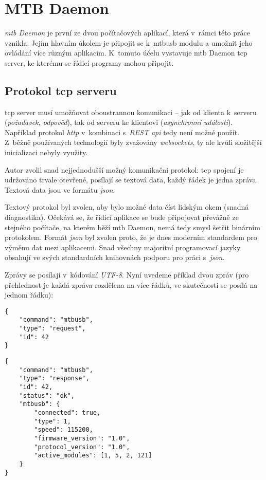 \newpage
\section{MTB Daemon}

\textit{\gls{mtb} Daemon} je první ze dvou počítačových aplikací, která v~rámci
této práce vznikla. Jejím hlavním úkolem je připojit se k~\gls{mtbusb} modulu a
umožnit jeho ovládání více různým aplikacím. K~tomuto účelu vystavuje \gls{mtb}
Daemon \gls{tcp} server, ke kterému se řídicí programy mohou připojit.

\subsection{Protokol \gls{tcp} serveru} \label{sec:daemon:proto}

\gls{tcp} server musí umožňovat oboustrannou komunikaci – jak od klienta k~serveru
(\textit{požadavek, odpověď}), tak od serveru ke klientovi (\textit{asynchronní
události}). Například protokol \textit{http} v~kombinaci s~\textit{REST \gls{api}}
tedy není možné použít. Z~běžně používaných technologií byly zvažovány
\textit{websockets}, ty ale kvůli složitější inicializaci nebyly využity.

Autor zvolil snad nejjednodušší možný komunikační protokol: \gls{tcp} spojení
je udržováno trvale otevřené, posílají se textová data, každý řádek je jedna
zpráva. Textová data jsou ve formátu \textit{json}.

Textový protokol byl zvolen, aby bylo možné data číst lidským okem
(snadná diagnostika). Očekává se, že řídicí aplikace se bude připojovat
převážně ze stejného počítače, na kterém běží \gls{mtb} Daemon, nemá tedy smysl
šetřit  binárním protokolem.
Formát \textit{json} byl zvolen proto, že je dnes moderním standardem pro
výměnu dat mezi aplikacemi. Snad všechny majoritní programovací jazyky obsahují
ve svých standardních knihovnách podporu pro práci s~\textit{json}.

Zprávy se posílají v~kódování \textit{UTF-8}. Nyní uvedeme příklad
dvou zpráv (pro přehlednost je každá zpráva rozdělena na více řádků, ve
skutečnosti se posílá na jednom řádku):

\begin{verbatim}
{
    "command": "mtbusb",
    "type": "request",
    "id": 42
}
\end{verbatim}
\newpage
\begin{verbatim}
{
    "command": "mtbusb",
    "type": "response",
    "id": 42,
    "status": "ok",
    "mtbusb": {
        "connected": true,
        "type": 1,
        "speed": 115200,
        "firmware_version": "1.0",
        "protocol_version": "1.0",
        "active_modules": [1, 5, 2, 121]
    }
}
\end{verbatim}

